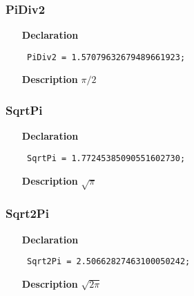 \documentclass[12pt,a4paper,oneside]{report}
\newcommand{\declarationitem}[1]{\textbf{#1}}
\newcommand{\descriptiontitle}[1]{\textbf{#1}}
\newcommand{\code}[1]{\texttt{#1}}
\begin{document}
\subsubsection{PiDiv2}
\label{utypes-PiDiv2}
\begin{itemize}\item[\declarationitem{Declaration}\hfill]
	\begin{flushleft}
		\code{
			PiDiv2     = 1.57079632679489661923;}
		
	\end{flushleft}
	
	\par
	\item[\descriptiontitle{Description}]
	$\pi/2$
	
\end{itemize}
\subsubsection{SqrtPi}
\label{utypes-SqrtPi}
\begin{itemize}\item[\declarationitem{Declaration}\hfill]
	\begin{flushleft}
		\code{
			SqrtPi     = 1.77245385090551602730;}
		
	\end{flushleft}
	
	\par
	\item[\descriptiontitle{Description}]
	$\sqrt{\pi}$
	
\end{itemize}
\subsubsection{Sqrt2Pi}
\label{utypes-Sqrt2Pi}
\begin{itemize}\item[\declarationitem{Declaration}\hfill]
	\begin{flushleft}
		\code{
			Sqrt2Pi    = 2.50662827463100050242;}
		
	\end{flushleft}
	
	\par
	\item[\descriptiontitle{Description}]
$\sqrt{2\pi}$
	
\end{itemize}
\end{document}
